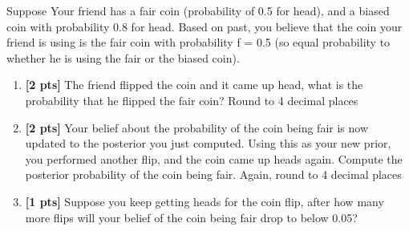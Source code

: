 \documentclass{article}
\newenvironment{soln}{
	\leavevmode\color{blue}\ignorespaces
}{}
\begin{document}
Suppose Your friend has a fair coin (probability of 0.5 for
head), and a biased coin with probability 0.8 for head. Based on past, you believe that the coin your friend is using is the fair coin with probability f = 0.5 (so equal probability to whether he is using the fair or the biased coin).
\begin{enumerate}[1). ]
\item \textbf{[2 pts]} The friend flipped the coin and it came up head, what is the probability that he flipped the fair coin? Round to 4 decimal places

  \begin{soln}

  \end{soln}

\item \textbf{[2 pts]} Your belief about the probability of the coin being fair is now updated to the posterior you just computed. Using this as your new
  prior, you performed another flip, and the coin came up heads
  again. Compute the posterior probability of the coin being fair. Again, round to 4 decimal places

  \begin{soln}
    
  \end{soln}
  
\item \textbf{[1 pts]} Suppose you keep getting heads for the coin flip, after how many more flips will your belief of the coin being fair drop to below 0.05?

\begin{soln}

\end{soln}

\end{enumerate}

\newpage
\end{document}
